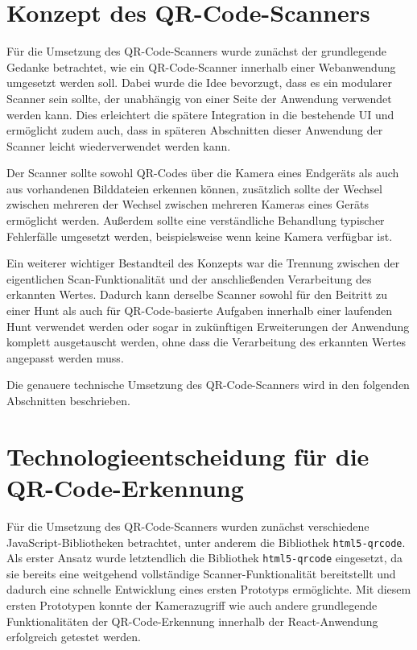 ﻿\documentclass[oneside]{ausarbeitung}
\begin{document}
\section{Konzept des QR-Code-Scanners}
\label{sec:qr-scanner-konzept}

Für die Umsetzung des QR-Code-Scanners wurde zunächst der grundlegende Gedanke betrachtet, wie ein QR-Code-Scanner innerhalb einer Webanwendung umgesetzt werden soll.
Dabei wurde die Idee bevorzugt, dass es ein modularer Scanner sein sollte, der unabhängig von einer Seite der Anwendung verwendet werden kann. Dies erleichtert die
spätere Integration in die bestehende UI und ermöglicht zudem auch, dass in späteren Abschnitten dieser Anwendung der Scanner leicht wiederverwendet werden kann.

Der Scanner sollte sowohl QR-Codes über die Kamera eines Endgeräts als auch aus vorhandenen Bilddateien erkennen können, zusätzlich sollte der Wechsel zwischen
mehreren der Wechsel zwischen mehreren Kameras eines Geräts ermöglicht werden. Außerdem sollte eine verständliche Behandlung typischer Fehlerfälle umgesetzt werden, 
beispielsweise wenn keine Kamera verfügbar ist.

Ein weiterer wichtiger Bestandteil des Konzepts war die Trennung zwischen der eigentlichen Scan-Funktionalität und der anschließenden Verarbeitung des erkannten Wertes. 
Dadurch kann derselbe Scanner sowohl für den Beitritt zu einer Hunt als auch für QR-Code-basierte Aufgaben innerhalb einer laufenden Hunt verwendet werden oder sogar
in zukünftigen Erweiterungen der Anwendung komplett ausgetauscht werden, ohne dass die Verarbeitung des erkannten Wertes angepasst werden muss.

Die genauere technische Umsetzung des QR-Code-Scanners wird in den folgenden Abschnitten beschrieben.


\section{Technologieentscheidung für die QR-Code-Erkennung}
\label{sec:technologieentscheidung-qr}

Für die Umsetzung des QR-Code-Scanners wurden zunächst verschiedene JavaScript-Bibliotheken betrachtet, unter anderem die Bibliothek
\texttt{html5-qrcode}. Als erster Ansatz wurde letztendlich die Bibliothek \texttt{html5-qrcode} eingesetzt, da sie bereits eine weitgehend 
vollständige Scanner-Funktionalität bereitstellt und dadurch eine schnelle Entwicklung eines ersten Prototyps ermöglichte.
Mit diesem ersten Prototypen konnte der Kamerazugriff wie auch andere grundlegende Funktionalitäten der QR-Code-Erkennung innerhalb der React-Anwendung
erfolgreich getestet werden.
\end{document}
